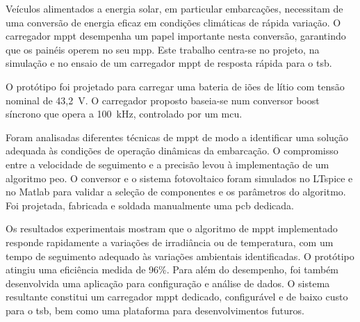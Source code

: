 

\noindent Veículos alimentados a energia solar, em particular embarcações, necessitam de uma conversão de energia eficaz em condições climáticas de rápida variação. O carregador \ac{mppt} desempenha um papel importante nesta conversão, garantindo que os painéis operem no seu \ac{mpp}. Este trabalho centra-se no projeto, na simulação e no ensaio de um carregador \ac{mppt} de resposta rápida para o \ac{tsb}.

O protótipo foi projetado para carregar uma bateria de iões de lítio com tensão nominal de 43,2~V. O carregador proposto baseia-se num conversor boost síncrono que opera a 100~kHz, controlado por um \ac{mcu}.

Foram analisadas diferentes técnicas de \ac{mppt} de modo a identificar uma solução adequada às condições de operação dinâmicas da embarcação. O compromisso entre a velocidade de seguimento e a precisão levou à implementação de um algoritmo \ac{peo}. O conversor e o sistema fotovoltaico foram simulados no LTspice e no Matlab para validar a seleção de componentes e os parâmetros do algoritmo. Foi projetada, fabricada e soldada manualmente uma \ac{pcb} dedicada.

Os resultados experimentais mostram que o algoritmo de \ac{mppt} implementado responde rapidamente a variações de irradiância ou de temperatura, com um tempo de seguimento adequado às variações ambientais identificadas. O protótipo atingiu uma eficiência medida de 96\%. Para além do desempenho, foi também desenvolvida uma aplicação para configuração e análise de dados. O sistema resultante constitui um carregador \ac{mppt} dedicado, configurável e de baixo custo para o \ac{tsb}, bem como uma plataforma para desenvolvimentos futuros.

\vspace{0.5cm}
